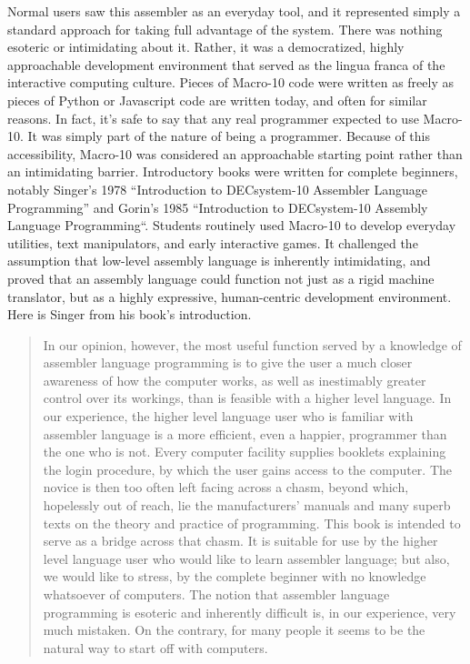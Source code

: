 Normal users saw this assembler as an everyday tool, and it represented simply a standard approach for taking full advantage of the system. There was nothing esoteric or intimidating about it. Rather, it was a democratized, highly approachable development environment that served as the lingua franca of the interactive computing culture. Pieces of Macro-10 code were written as freely as pieces of Python or Javascript code are written today, and often for similar reasons. In fact, it’s safe to say that any real programmer expected to use Macro-10. It was simply part of the nature of being a programmer. Because of this accessibility, Macro-10 was considered an approachable starting point rather than an intimidating barrier. Introductory books were written for complete beginners, notably Singer’s 1978 “Introduction to DECsystem-10 Assembler Language Programming” and Gorin’s 1985 “Introduction to DECsystem-10 Assembly Language Programming“. Students routinely used Macro-10 to develop everyday utilities, text manipulators, and early interactive games. It challenged the assumption that low-level assembly language is inherently intimidating, and proved that an assembly language could function not just as a rigid machine translator, but as a highly expressive, human-centric development environment. Here is Singer from his book’s introduction.

\begin{quotation}
In our opinion, however, the most useful function served by a knowledge of assembler language programming is to give the user a much closer awareness of how the computer works, as well as inestimably greater control over its workings, than is feasible with a higher level language. In our experience, the higher level language user who is familiar with assembler language is a more efficient, even a happier, programmer than the one who is not. Every computer facility supplies booklets explaining the login procedure, by which the user gains access to the computer. The novice is then too often left facing across a chasm, beyond which, hopelessly out of reach, lie the manufacturers' manuals and many superb texts on the theory and practice of programming. This book is intended to serve as a bridge across that chasm. It is suitable for use by the higher level language user who would like to learn assembler language; but also, we would like to stress, by the complete beginner with no knowledge whatsoever of computers. The notion that assembler language programming is esoteric and inherently difficult is, in our experience, very much mistaken. On the contrary, for many people it seems to be the natural way to start off with computers. \cite{singerIntroductionDECsystem10Assembler1978}
\end{quotation}

